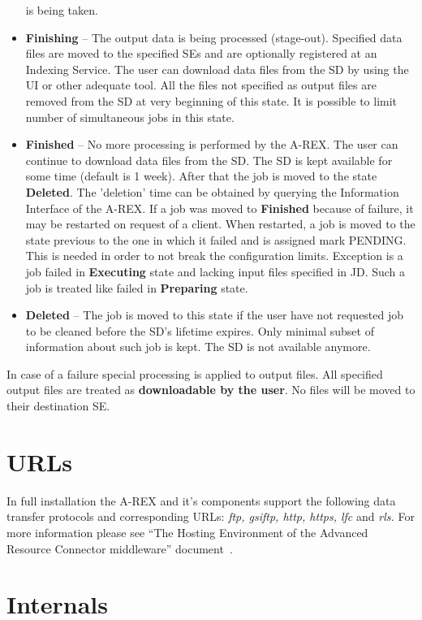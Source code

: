 \documentclass{article}                            %
\begin{document}
\begin{itemize}
is being taken.
\item \textbf{Finishing} -- The output data is being processed (stage-out).
Specified data files are moved to the specified SEs and are optionally
registered at an Indexing Service. The user can download data files
from the SD by using the UI or other adequate tool. All the files
not specified as output files are removed from the SD at very beginning
of this state. It is possible to limit number of simultaneous jobs
in this state.
\item \textbf{Finished} -- No more processing is performed by the A-REX.
The user can continue to download data files from the SD. The SD is
kept available for some time (default is 1 week). After that the job
is moved to the state \textbf{Deleted}. The 'deletion' time can be
obtained by querying the Information Interface of the A-REX. If a
job was moved to \textbf{Finished} because of failure, it may be restarted
on request of a client. When restarted, a job is moved to the state
previous to the one in which it failed and is assigned mark PENDING.
This is needed in order to not break the configuration limits. Exception
is a job failed in \textbf{Executing} state and lacking input files
specified in JD. Such a job is treated like failed in \textbf{Preparing}
state.
\item \textbf{Deleted} -- The job is moved to this state if the user have
not requested job to be cleaned before the SD's lifetime expires.
Only minimal subset of information about such job is kept. The SD
is not available anymore.
\end{itemize}
In case of a failure special processing is applied to output files.
All specified output files are treated as \textbf{downloadable by
the user}. No files will be moved to their destination SE.

\section{URLs\label{sec:urls}}

In full installation the A-REX and it's components support the following
data transfer protocols and corresponding URLs: \emph{ftp, gsiftp,
http, https, lfc} and \emph{rls.} For more information please see
{}``The Hosting Environment of the Advanced Resource Connector middleware''
document~\cite{hed}.

\section{Internals\label{section:internals}}
\end{document}
